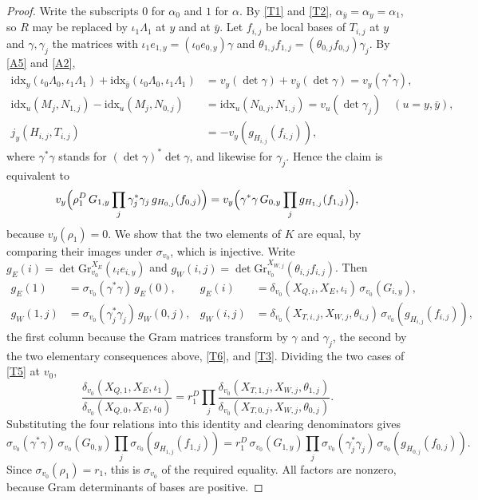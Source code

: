 \documentclass[11pt]{amsart}
\theoremstyle{plain}
\theoremstyle{definition}
\numberwithin{equation}{section}
\begin{document}
\begin{proof}
Write the subscripts $0$ for $\alpha_0$ and $1$ for $\alpha$. By \ref{T1} and \ref{T2}, $\alpha_{\bar y}=\alpha_y=\alpha_1$,
so $R$ may be replaced by $\iota_1\Lambda_1$ at $y$ and at $\bar y$. Let $f_{i,j}$ be local bases of $T_{i,j}$ at $y$ and
$\gamma,\gamma_j$ the matrices with $\iota_1e_{1,y}=(\iota_0e_{0,y})\gamma$ and
$\theta_{1,j}f_{1,j}=(\theta_{0,j}f_{0,j})\gamma_j$. By \ref{A5} and \ref{A2},
\begin{align*}
\mathrm{idx}_y(\iota_0\Lambda_0,\iota_1\Lambda_1)+\mathrm{idx}_{\bar y}(\iota_0\Lambda_0,\iota_1\Lambda_1)&=v_y(\det\gamma)+v_{\bar y}(\det\gamma)=v_y(\gamma^\ast\gamma),\\
\mathrm{idx}_u(M_j,N_{1,j})-\mathrm{idx}_u(M_j,N_{0,j})&=\mathrm{idx}_u(N_{0,j},N_{1,j})=v_u(\det\gamma_j)\quad(u=y,\bar y),\\
j_y(H_{i,j},T_{i,j})&=-v_y(g_{H_{i,j}}(f_{i,j})),
\end{align*}
where $\gamma^\ast\gamma$ stands for $(\det\gamma)^\ast\det\gamma$, and likewise for $\gamma_j$. Hence the claim is
equivalent to
\[
v_y\Bigl(\rho_1^D\,G_{1,y}\prod_j\gamma_j^\ast\gamma_j\,g_{H_{0,j}}(f_{0,j})\Bigr)=v_y\Bigl(\gamma^\ast\gamma\,G_{0,y}\prod_jg_{H_{1,j}}(f_{1,j})\Bigr),
\]
because $v_y(\rho_1)=0$. We show that the two elements of $K$ are equal, by comparing their images
under $\sigma_{v_0}$, which is injective. Write $g_E(i)=\det\mathrm{Gr}^{X_E}_{v_0}(\iota_ie_{i,y})$ and
$g_W(i,j)=\det\mathrm{Gr}^{X_{W,j}}_{v_0}(\theta_{i,j}f_{i,j})$. Then
\begin{align*}
g_E(1)&=\sigma_{v_0}(\gamma^\ast\gamma)\,g_E(0), & g_E(i)&=\delta_{v_0}(X_{Q,i},X_E,\iota_i)\,\sigma_{v_0}(G_{i,y}),\\
g_W(1,j)&=\sigma_{v_0}(\gamma_j^\ast\gamma_j)\,g_W(0,j), & g_W(i,j)&=\delta_{v_0}(X_{T,i,j},X_{W,j},\theta_{i,j})\,\sigma_{v_0}(g_{H_{i,j}}(f_{i,j})),
\end{align*}
the first column because the Gram matrices transform by $\gamma$ and $\gamma_j$, the second by the two
elementary consequences above, \ref{T6}, and \ref{T3}. Dividing the two cases of \ref{T5} at $v_0$,
\[
\frac{\delta_{v_0}(X_{Q,1},X_E,\iota_1)}{\delta_{v_0}(X_{Q,0},X_E,\iota_0)}=r_1^D\prod_j\frac{\delta_{v_0}(X_{T,1,j},X_{W,j},\theta_{1,j})}{\delta_{v_0}(X_{T,0,j},X_{W,j},\theta_{0,j})}.
\]
Substituting the four relations into this identity and clearing denominators gives
\[
\sigma_{v_0}(\gamma^\ast\gamma)\,\sigma_{v_0}(G_{0,y})\prod_j\sigma_{v_0}(g_{H_{1,j}}(f_{1,j}))
=r_1^D\,\sigma_{v_0}(G_{1,y})\prod_j\sigma_{v_0}(\gamma_j^\ast\gamma_j)\,\sigma_{v_0}(g_{H_{0,j}}(f_{0,j})).
\]
Since
$\sigma_{v_0}(\rho_1)=r_1$, this is $\sigma_{v_0}$ of the required equality. All factors are nonzero, because
Gram determinants of bases are positive.
\end{proof}
\end{document}
